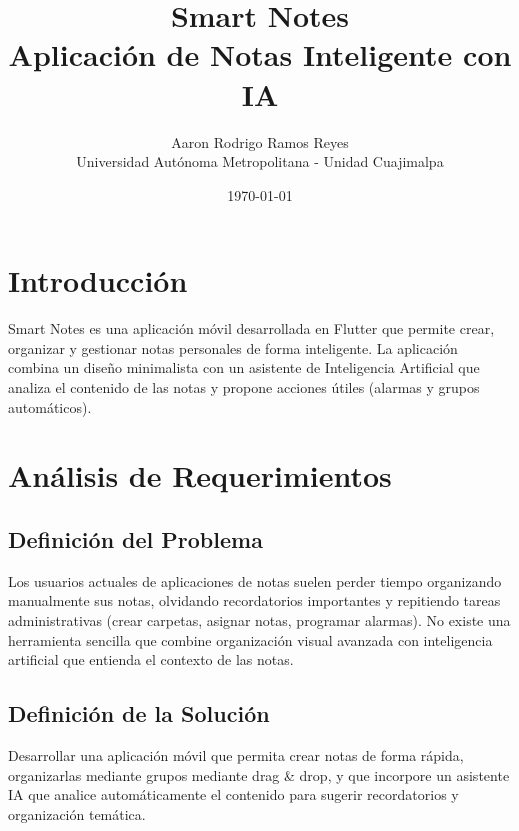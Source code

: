 \documentclass[12pt,a4paper]{article}
\title{\textbf{Smart Notes} \\ Aplicación de Notas Inteligente con IA}
\author{Aaron Rodrigo Ramos Reyes \\ Universidad Autónoma Metropolitana - Unidad Cuajimalpa}
\date{\today}
\begin{document}
\maketitle
\thispagestyle{empty}
\newpage

\tableofcontents
\newpage

\section{Introducción}
Smart Notes es una aplicación móvil desarrollada en Flutter que permite crear, organizar y gestionar notas personales de forma inteligente. La aplicación combina un diseño minimalista con un asistente de Inteligencia Artificial que analiza el contenido de las notas y propone acciones útiles (alarmas y grupos automáticos).

\section{Análisis de Requerimientos}

\subsection{Definición del Problema}
Los usuarios actuales de aplicaciones de notas suelen perder tiempo organizando manualmente sus notas, olvidando recordatorios importantes y repitiendo tareas administrativas (crear carpetas, asignar notas, programar alarmas). No existe una herramienta sencilla que combine organización visual avanzada con inteligencia artificial que entienda el contexto de las notas.

\subsection{Definición de la Solución}
Desarrollar una aplicación móvil que permita crear notas de forma rápida, organizarlas mediante grupos mediante drag \& drop, y que incorpore un asistente IA que analice automáticamente el contenido para sugerir recordatorios y organización temática.
\end{document}
